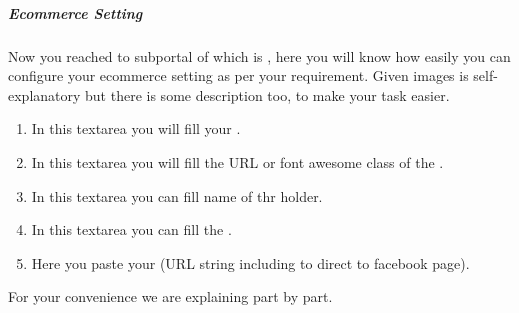 \documentclass[a4paper,10pt,english]{report}
\begin{document}
\subparagraph{Ecommerce Setting}
\label{\detokenize{globalsetting:ecommerce-setting}}\label{\detokenize{globalsetting:id3}}\begin{quote}

\begin{figure}[htbp]
\centering

\noindent{}
\end{figure}
\end{quote}

Now you reached to subportal of  which is , here you will know how easily you can configure your ecommerce setting as per your requirement. Given images is self-explanatory but there is some description too, to make your task easier.
\begin{enumerate}
\def\theenumi{\arabic{enumi}}
\def\labelenumi{\theenumi .}
\makeatletter\def\p@enumii{\p@enumi \theenumi .}\makeatother
\item {} 
In this textarea you will fill your .

\item {} 
In this textarea you will fill the URL or font awesome class of the .

\item {} 
In this textarea you can fill name of thr  holder.

\item {} 
In this textarea you can fill the .

\item {} 
Here you paste your  (URL string including  to direct to facebook page).

\end{enumerate}

For your convenience we are explaining part by part.

\begin{figure}[htbp]
\centering

\noindent{}
\end{figure}
\end{document}
